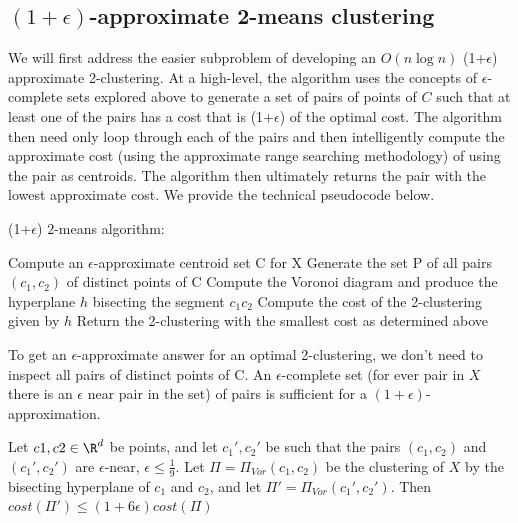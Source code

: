 \subsection{$(1+\epsilon)$-approximate 2-means clustering}
We will first address the easier subproblem of developing an $O(n \log n)$
(1+$\epsilon$) approximate 2-clustering. At a high-level, the algorithm uses
the concepts of $\epsilon$-complete sets explored above to generate a set of
pairs of points of $C$ such that at least one of the pairs has a cost that
is (1+$\epsilon$) of the optimal cost. The algorithm then need only loop through
each of the pairs and then intelligently compute the approximate cost (using the
approximate range searching methodology) of using the pair as centroids. The
algorithm then ultimately returns the pair with the lowest approximate cost.
We provide the technical pseudocode below.

\begin{algorithm}[H]
  \caption{(1+$\epsilon$) $2$-means algorithm:}
\begin{algorithmic} 
\STATE Compute an $\epsilon$-approximate centroid set C for X
\STATE Generate the set P of all pairs $(c_1, c_2)$ of distinct points of C
    \STATE Compute the Voronoi diagram and produce the hyperplane $h$ bisecting the segment $c_1 c_2$
    \STATE Compute the cost of the 2-clustering given by $h$
\ENDFOR
\STATE Return the 2-clustering with the smallest cost as determined above
\end{algorithmic}
\end{algorithm}

To get an $\epsilon$-approximate answer for an optimal 2-clustering, we don't need to inspect all pairs of distinct points of C.  An $\epsilon$-complete set (for ever pair in $X$ there is an $\epsilon$ near pair in the set) of pairs is sufficient for a $(1+\epsilon)$-approximation. 

\begin{lemma}
Let $c1, c2 \in \R^d$ be points, and let $c_1', c_2'$ be such that the pairs $(c_1,c_2)$ and $(c_1',c_2')$ are $\epsilon$-near, $\epsilon \leq \frac{1}{9}$. Let $\Pi = \Pi_{Vor}(c_1, c_2)$ be the clustering of $X$ by the bisecting hyperplane of $c_1$ and $c_2$, and let $\Pi' = \Pi_{Vor}(c_1', c_2')$. Then $cost(\Pi')\leq (1+ 6 \epsilon)cost(\Pi)$
\end{lemma}

